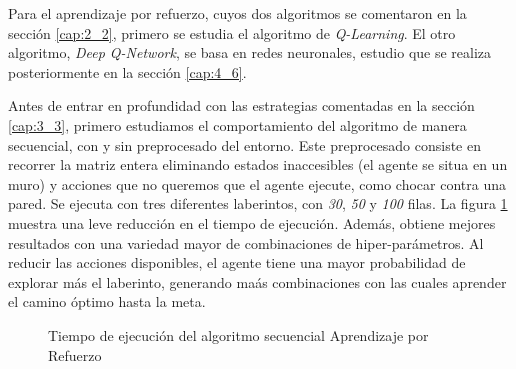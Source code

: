 	Para el aprendizaje por refuerzo, cuyos dos algoritmos se comentaron en la sección \ref{cap:2_2}, primero se estudia el algoritmo de \textit{Q-Learning}. El otro algoritmo, \textit{Deep Q-Network}, se basa en redes neuronales, estudio que se realiza posteriormente en la sección \ref{cap:4_6}.
	
	
		Antes de entrar en profundidad con las estrategias comentadas en la sección \ref{cap:3_3}, primero estudiamos el comportamiento del algoritmo de manera secuencial, con y sin preprocesado del entorno. Este preprocesado consiste en recorrer la matriz entera eliminando estados inaccesibles (el agente se situa en un muro) y acciones que no queremos que el agente ejecute, como chocar contra una pared. Se ejecuta con tres diferentes laberintos, con \textit{30}, \textit{50} y \textit{100} filas. La figura \ref{fig:rl_preprocesado} muestra una leve reducción en el tiempo de ejecución. Además, obtiene mejores resultados con una variedad mayor de combinaciones de hiper-parámetros. Al reducir las acciones disponibles, el agente tiene una mayor probabilidad de explorar más el laberinto, generando maás combinaciones con las cuales aprender el camino óptimo hasta la meta.			
	

		\begin{figure}[!h]
			\centering
			\caption{Tiempo de ejecución del algoritmo secuencial Aprendizaje por Refuerzo}
			\label{fig:rl_preprocesado}
		\end{figure}
		
